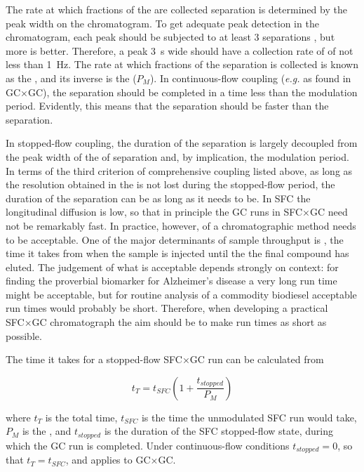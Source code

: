 The rate at which fractions of the \oneD are collected separation is determined
by the peak width on the \oneD chromatogram. To get adequate peak detection in
the \oneD chromatogram, each \oneD peak should be subjected to at least \num{3}
\twoD separations \autocite{Murphy1998}, but more is better. Therefore, a peak
\SI{3}{s} wide should have a collection rate of of not less than \SI{1}{\hertz}.
The rate at which fractions of the \oneD separation is collected is known as the
, and its inverse is the 
(\(P_M\)). In continuous-flow coupling (\textit{e.g.} as found in GC×GC), the
\twoD separation should be completed in a time less than the modulation period.
Evidently, this means that the \twoD separation should be faster than the \oneD
separation.

In stopped-flow coupling, the duration of the \twoD separation is largely
decoupled from the peak width of the of \oneD separation and, by implication,
the \oneD modulation period. In terms of the third criterion of comprehensive
coupling listed above, as long as the resolution obtained in the \oneD is not
lost during the stopped-flow period, the duration of the \twoD separation can be
as long as it needs to be. In SFC the longitudinal diffusion is low, so that in
principle the \twoD GC runs in SFC×GC need not be remarkably fast. In practice,
however,  of a chromatographic method needs to be
acceptable. One of the major determinants of sample throughput is , the time it takes from when the sample is injected until the the final
compound has eluted. The judgement of what is acceptable depends strongly on
context: for finding the proverbial biomarker for Alzheimer's disease a very
long run time might be acceptable, but for routine analysis of a commodity
biodiesel acceptable run times would probably be short. Therefore, when
developing a practical SFC×GC chromatograph the aim should be to make run times
as short as possible. 

The time it takes for a stopped-flow SFC×GC run can be calculated from

\[t_{T} = t_{SFC} ( 1 + \frac{t_{stopped}}{P_{M}} ) \]

where \(t_T\) is the total time, \(t_{SFC}\) is the time the unmodulated SFC run
would take, \(P_M\) is the , and \(t_{stopped}\) is
the duration of the SFC stopped-flow state, during which the GC run is
completed. Under continuous-flow conditions \( t_{stopped}=0 \), so that \(t_{T}
= t_{SFC}\), and applies to GC×GC.

